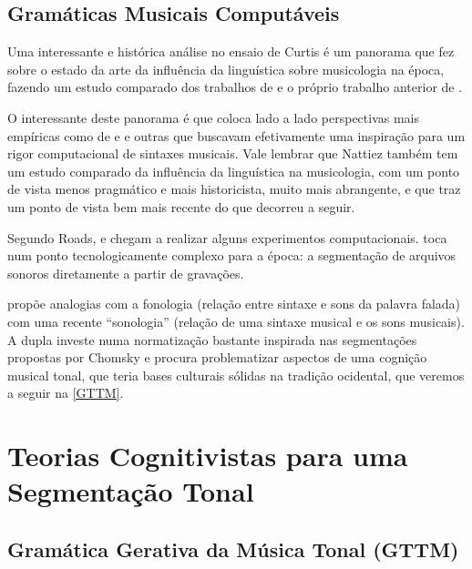 \documentclass[
	12pt,				%
	openright,			%
	twoside,			%
	a4paper,			%
	english,			%
	french,				%
	spanish,			%
	brazil				%
	]{abntex2}
\begin{document}
\section{Gramáticas Musicais Computáveis}

Uma interessante e histórica análise no ensaio de Curtis  é um panorama que fez sobre o estado da arte da influência da linguística sobre musicologia na época, fazendo um estudo comparado dos trabalhos de  e o próprio trabalho anterior de .


O interessante deste panorama é que coloca lado a lado perspectivas mais empíricas como de  e  e outras que buscavam efetivamente uma inspiração para um rigor computacional de sintaxes musicais. Vale lembrar que Nattiez também tem um estudo comparado da influência da linguística na musicologia, com um ponto de vista menos pragmático e mais historicista, muito mais abrangente, e que traz um ponto de vista bem mais recente \cite{nattiez2004modelos} do que decorreu a seguir.


Segundo Roads,  e  chegam a realizar alguns experimentos computacionais.  toca num ponto tecnologicamente complexo para a época: a segmentação de arquivos sonoros diretamente a partir de gravações. 

 propõe analogias com a fonologia (relação entre sintaxe e sons da palavra falada) com uma recente “sonologia” (relação de uma sintaxe musical e os sons musicais). A dupla  investe numa normatização bastante inspirada nas segmentações propostas por Chomsky e procura problematizar aspectos de uma cognição musical tonal, que teria bases culturais sólidas na tradição ocidental, que veremos a seguir na \autoref{GTTM}.



\chapter{Teorias Cognitivistas para uma Segmentação Tonal}

\section{Gramática Gerativa da Música Tonal (GTTM)}
\label{GTTM}
\end{document}
